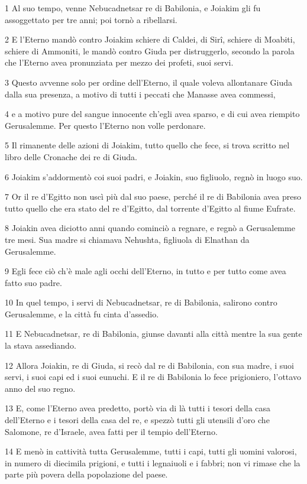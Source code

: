 \par 1 Al suo tempo, venne Nebucadnetsar re di Babilonia, e Joiakim gli fu assoggettato per tre anni; poi tornò a ribellarsi.
\par 2 E l'Eterno mandò contro Joiakim schiere di Caldei, di Sirî, schiere di Moabiti, schiere di Ammoniti, le mandò contro Giuda per distruggerlo, secondo la parola che l'Eterno avea pronunziata per mezzo dei profeti, suoi servi.
\par 3 Questo avvenne solo per ordine dell'Eterno, il quale voleva allontanare Giuda dalla sua presenza, a motivo di tutti i peccati che Manasse avea commessi,
\par 4 e a motivo pure del sangue innocente ch'egli avea sparso, e di cui avea riempito Gerusalemme. Per questo l'Eterno non volle perdonare.
\par 5 Il rimanente delle azioni di Joiakim, tutto quello che fece, si trova scritto nel libro delle Cronache dei re di Giuda.
\par 6 Joiakim s'addormentò coi suoi padri, e Joiakin, suo figliuolo, regnò in luogo suo.
\par 7 Or il re d'Egitto non uscì più dal suo paese, perché il re di Babilonia avea preso tutto quello che era stato del re d'Egitto, dal torrente d'Egitto al fiume Eufrate.
\par 8 Joiakin avea diciotto anni quando cominciò a regnare, e regnò a Gerusalemme tre mesi. Sua madre si chiamava Nehushta, figliuola di Elnathan da Gerusalemme.
\par 9 Egli fece ciò ch'è male agli occhi dell'Eterno, in tutto e per tutto come avea fatto suo padre.
\par 10 In quel tempo, i servi di Nebucadnetsar, re di Babilonia, salirono contro Gerusalemme, e la città fu cinta d'assedio.
\par 11 E Nebucadnetsar, re di Babilonia, giunse davanti alla città mentre la sua gente la stava assediando.
\par 12 Allora Joiakin, re di Giuda, si recò dal re di Babilonia, con sua madre, i suoi servi, i suoi capi ed i suoi eunuchi. E il re di Babilonia lo fece prigioniero, l'ottavo anno del suo regno.
\par 13 E, come l'Eterno avea predetto, portò via di là tutti i tesori della casa dell'Eterno e i tesori della casa del re, e spezzò tutti gli utensili d'oro che Salomone, re d'Israele, avea fatti per il tempio dell'Eterno.
\par 14 E menò in cattività tutta Gerusalemme, tutti i capi, tutti gli uomini valorosi, in numero di diecimila prigioni, e tutti i legnaiuoli e i fabbri; non vi rimase che la parte più povera della popolazione del paese.
